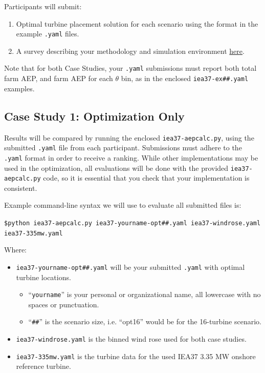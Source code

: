 \documentclass{article}
\begin{document}
    Participants will submit:
    \begin{enumerate}
        \item Optimal turbine placement solution for each scenario using the format in the example \texttt{.yaml} files. 
        \item A survey describing your methodology and simulation environment \href{https://goo.gl/forms/2tX3eJ0rlnElmTgR2}{here}.
    \end{enumerate}

    \hfill \break \indent Note that for both Case Studies, your \texttt{.yaml} submissions must report both total farm AEP, and farm AEP for each $\theta$ bin, as in the enclosed \texttt{iea37-ex\#\#.yaml} examples.

    \subsection{Case Study 1: Optimization Only}

        Results will be compared by running the enclosed \texttt{iea37-aepcalc.py}, using the submitted \texttt{.yaml} file from each participant.
        Submissions must adhere to the \texttt{.yaml} format in order to receive a ranking.
        While other implementations may be used in the optimization, all evaluations will be done with the provided \texttt{iea37-aepcalc.py} code, so it is essential that you check that your implementation is consistent.

        Example command-line syntax we will use to evaluate all submitted files is:
        
        \vspace{0.5em}
        \texttt{\$python iea37-aepcalc.py iea37-yourname-opt\#\#.yaml iea37-windrose.yaml iea37-335mw.yaml}
        \vspace{0.5em}
        
        \noindent Where: 
        \begin{itemize}[noitemsep,topsep=0pt,parsep=0pt,partopsep=0pt]
            \item \texttt{iea37-yourname-opt\#\#.yaml} will be your submitted \texttt{.yaml} with optimal turbine locations.
            \begin{itemize}
                \item ``\texttt{yourname}'' is your personal or organizational name, all lowercase with no spaces or punctuation.
                \item ``\texttt{\#\#}'' is the scenario size, i.e. ``opt16'' would be for the 16-turbine scenario.
            \end{itemize}
            \item \texttt{iea37-windrose.yaml} is the binned wind rose used for both case studies.
            \item \texttt{iea37-335mw.yaml} is the turbine data for the used IEA37 3.35 MW onshore reference turbine.
        \end{itemize}
\end{document}
